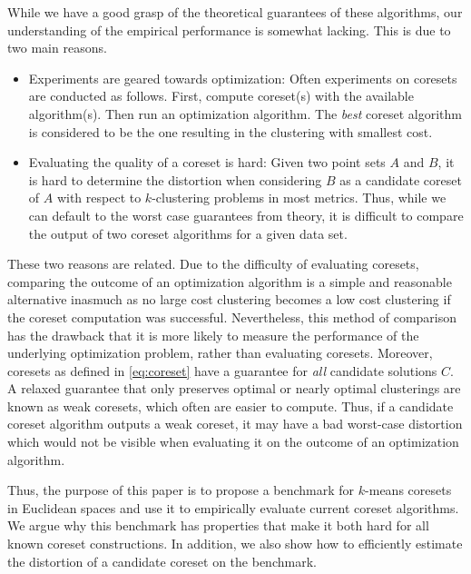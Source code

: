 While we have a good grasp of the theoretical guarantees of these algorithms, our understanding of the empirical performance is somewhat lacking.
This is due to two main reasons.
\begin{itemize}
\item Experiments are geared towards optimization: Often experiments on coresets are conducted as follows. First, compute coreset(s) with the available algorithm(s). Then run an optimization algorithm. The \emph{best} coreset algorithm is considered to be the one resulting in the clustering with smallest cost. 
\item Evaluating the quality of a coreset is hard: Given two point sets $A$ and $B$, it is hard to determine the distortion when considering $B$ as a candidate coreset of $A$ with respect to $k$-clustering problems in most metrics. Thus, while we can default to the worst case guarantees from theory, it is difficult to compare the output of two coreset algorithms for a given data set.
\end{itemize}

These two reasons are related. Due to the difficulty of evaluating coresets, comparing the outcome of an optimization algorithm is a simple and reasonable alternative inasmuch as no large cost clustering becomes a low cost clustering if the coreset computation was successful. Nevertheless, this method of comparison has the drawback that it is more likely to measure the performance of the underlying optimization problem, rather than evaluating coresets. Moreover, coresets as defined in \cref{eq:coreset} have a guarantee for \emph{all} candidate solutions $C$. A relaxed guarantee that only preserves optimal or nearly optimal clusterings are known as weak coresets, which often are easier to compute. Thus, if a candidate coreset algorithm outputs a weak coreset, it may have a bad worst-case distortion which would not be visible when evaluating it on the outcome of an optimization algorithm.

Thus, the purpose of this paper is to propose a benchmark for $k$-means coresets in Euclidean spaces and use it to empirically evaluate current coreset algorithms.
We argue why this benchmark has properties that make it both hard for all known coreset constructions. In addition, we also show how to efficiently estimate the distortion of a candidate coreset on the benchmark.

